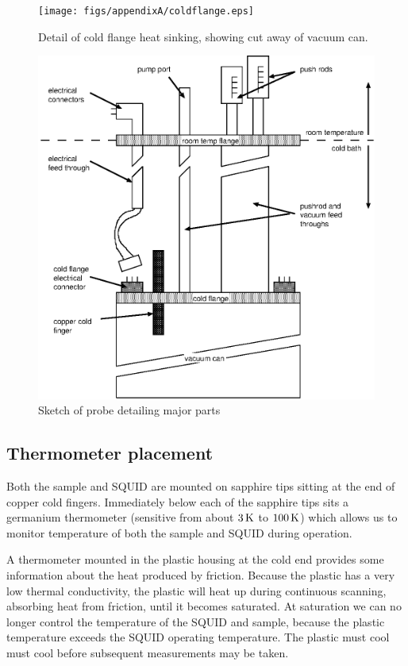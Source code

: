 %
%
\begin{figure}[p]
\texttt{[image: figs/appendixA/coldflange.eps]}
\caption[Detail of cold flange heat sinking]{Detail of cold flange
heat sinking, showing cut away of vacuum can.}
\label{fig:heat_sinking}
\end{figure}

\begin{figure}[p]
\includegraphics{figs/appendixA/probesketch.eps}
\caption[Sketch of probe detailing major parts]
{Sketch of probe detailing major parts}
\label{fig:overall_probe_sketch}
\end{figure}

\subsection{Thermometer placement}

Both the sample and SQUID are mounted on sapphire tips
sitting at the end of copper cold fingers. Immediately below each of the 
sapphire tips sits a germanium thermometer\cite{lakeshore_cryotronics} 
(sensitive from about $3\,\kelvin$ to $100\,\kelvin$)
which allows us to monitor
temperature of both the sample and SQUID during 
operation. 

A thermometer mounted in the plastic housing at the cold
end provides some information about the heat produced by
friction. 
Because the plastic has a very low thermal conductivity,
the plastic will heat up during continuous scanning, absorbing 
heat from friction, until it becomes saturated. 
At saturation we can no longer control the 
temperature of the SQUID and sample, 
because the plastic temperature exceeds the SQUID operating temperature.
The plastic must cool
must
cool before subsequent measurements may be taken. 

